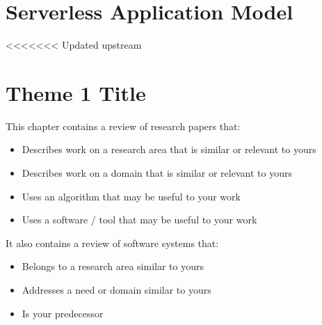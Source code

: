 \section{Serverless Application Model}

<<<<<<< Updated upstream
\begin{comment}
%
%
Guide on Writing your RRL chapter
 
1. Identify the keywords with respect to your research
      One keyword = One document section
                Examples: 2.1 Story Generation Systems
			 2.2 Knowledge Representation

2.  Find references using these keywords

3.  For each of the references that you find,
        Check: Is it relevant to your research?
        Use their references to find more relevant works.

4. Identify a set of criteria for comparison.
       It will serve as a guide to help you focus on what to look for

5. Write a summary focusing on -
       What: A short description of the work
       How: A summary of the approach it utilized
       Findings: If applicable, provide the results
        Why: Relevance to your work

6. At the end of each section,  show a Table of Comparison of the related works 
   and your proposed project/system

\end{comment}

\section{Theme 1 Title}
This chapter  contains a review of research papers that:
%
%
\begin{itemize}
\item Describes work on a research area that is similar or relevant to yours
\item Describes work on a domain that is similar or relevant to yours
\item Uses an algorithm that may be useful to your work
\item Uses a software / tool that may be useful to your work
\end{itemize}

It also contains a review of software systems that:
%
%
\begin{itemize}
   \item Belongs to a research area similar to yours
   \item Addresses a need or domain similar to yours
   \item Is your predecessor
\end{itemize}

